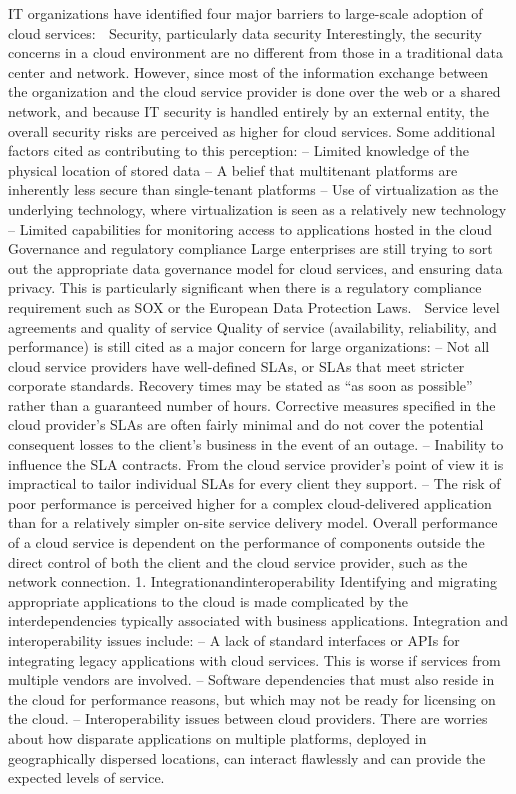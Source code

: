 IT organizations have identified four major barriers to large-scale adoption of cloud services:
􏰂 Security, particularly data security
Interestingly, the security concerns in a cloud environment are no different from those in a traditional data center and network. However, since most of the information exchange between the organization and the cloud service provider is done over the web or a shared network, and because IT security is handled entirely by an external entity, the overall security risks are perceived as higher for cloud services.
Some additional factors cited as contributing to this perception:
– Limited knowledge of the physical location of stored data
– A belief that multitenant platforms are inherently less secure than single-tenant platforms
– Use of virtualization as the underlying technology, where virtualization is seen as a relatively new technology
– Limited capabilities for monitoring access to applications hosted in the cloud
􏰂 Governance and regulatory compliance
Large enterprises are still trying to sort out the appropriate data governance model for cloud services, and ensuring data privacy. This is particularly significant when there is a regulatory compliance requirement such as SOX or the European Data Protection Laws.
􏰂 Service level agreements and quality of service
Quality of service (availability, reliability, and performance) is still cited as a
major concern for large organizations:
– Not all cloud service providers have well-defined SLAs, or SLAs that meet stricter corporate standards. Recovery times may be stated as “as soon as possible” rather than a guaranteed number of hours. Corrective measures specified in the cloud provider's SLAs are often fairly minimal and do not cover the potential consequent losses to the client's business in the event of an outage.
– Inability to influence the SLA contracts. From the cloud service provider's point of view it is impractical to tailor individual SLAs for every client they support.
– The risk of poor performance is perceived higher for a complex cloud-delivered application than for a relatively simpler on-site service delivery model. Overall performance of a cloud service is dependent on the performance of components outside the direct control of both the client and the cloud service provider, such as the network connection.
1. Integrationandinteroperability
Identifying and migrating appropriate applications to the cloud is made complicated by the interdependencies typically associated with business applications. Integration and interoperability issues include:
– A lack of standard interfaces or APIs for integrating legacy applications with cloud services. This is worse if services from multiple vendors are involved.
– Software dependencies that must also reside in the cloud for performance reasons, but which may not be ready for licensing on the cloud.
– Interoperability issues between cloud providers. There are worries about how disparate applications on multiple platforms, deployed in geographically dispersed locations, can interact flawlessly and can provide the expected levels of service.


